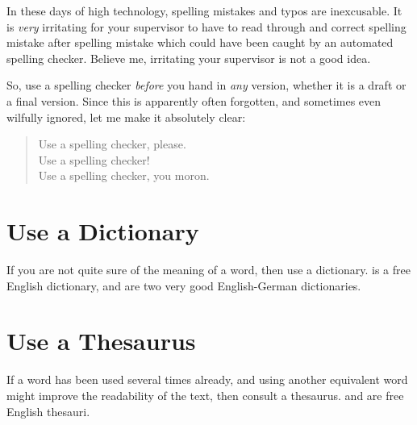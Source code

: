 In these days of high technology, spelling mistakes and typos are
inexcusable. It is \emph{very} irritating for your supervisor to have
to read through and correct spelling mistake after spelling mistake
which could have been caught by an automated spelling checker.
Believe me, irritating your supervisor is not a good idea.

So, use a spelling checker \emph{before} you hand in \emph{any}
version, whether it is a draft or a final version.
Since this is apparently often forgotten, and sometimes even wilfully
ignored, let me make it absolutely clear:
\begin{quote}
\begin{em}
Use a spelling checker, please. \\
Use a spelling checker! \\
Use a spelling checker, you moron. \\
\end{em}
\end{quote}





\section{Use a Dictionary}

If you are not quite sure of the meaning of a word, then use a
dictionary.  \textcite{DictionaryCom} is a free English dictionary,
\textcite{DictChemnitz} and \textcite{DictLeoOrg} are two very good
English-German dictionaries.




\section{Use a Thesaurus}

If a word has been used several times already, and using another
equivalent word might improve the readability of the text, then
consult a thesaurus. \textcite{Roget} and \textcite{RogetII} are free
English thesauri.


